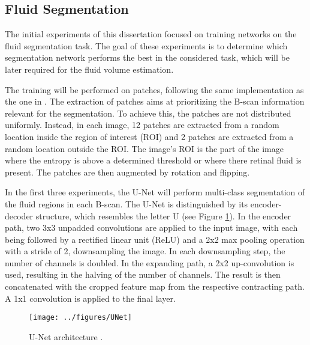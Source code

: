 \subsection{Fluid Segmentation}
The initial experiments of this dissertation focused on training networks on the fluid segmentation task. The goal of these experiments is to determine which segmentation network performs the best in the considered task, which will be later required for the fluid volume estimation.
\par
The training will be performed on patches, following the same implementation as the one in \textcite{Tennakoon2018}. The extraction of patches aims at prioritizing the B-scan information relevant for the segmentation. To achieve this, the patches are not distributed uniformly. Instead, in each image, 12 patches are extracted from a random location inside the region of interest (ROI) and 2 patches are extracted from a random location outside the ROI. The image's ROI is the part of the image where the entropy is above a determined threshold or where there retinal fluid is present. The patches are then augmented by rotation and flipping.
\par
In the first three experiments, the U-Net \parencite{Ronneberger2015} will perform multi-class segmentation of the fluid regions in each B-scan. The U-Net is distinguished by its encoder-decoder structure, which resembles the letter U (see Figure \ref{fig:UNet}). In the encoder path, two 3x3 unpadded convolutions are applied to the input image, with each being followed by a rectified linear unit (ReLU) and a 2x2 max pooling operation with a stride of 2, downsampling the image. In each downsampling step, the number of channels is doubled. In the expanding path, a 2x2 up-convolution is used, resulting in the halving of the number of channels. The result is then concatenated with the cropped feature map from the respective contracting path. A 1x1 convolution is applied to the final layer.

\begin{figure}[!ht]
	\centering
	\texttt{[image: ../figures/UNet]}
	\caption{U-Net architecture \cite{Ronneberger2015}.}
	\label{fig:UNet}
\end{figure}

